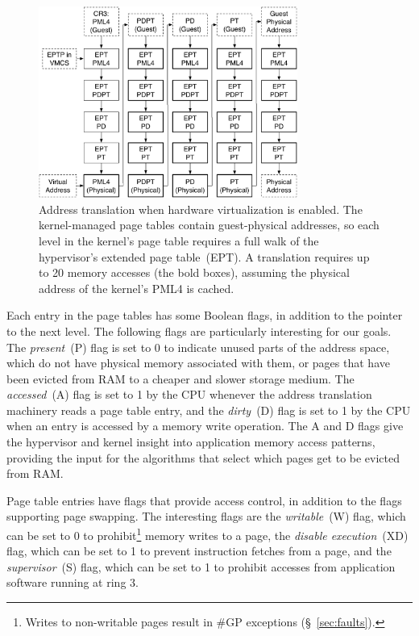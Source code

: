 \begin{figure}[hbt]
  \centering
  \includegraphics[width=85mm]{figures/vmx_paging.pdf}
  \caption{
    Address translation when hardware virtualization is enabled. The
    kernel-managed page tables contain guest-physical addresses, so each level
    in the kernel's page table requires a full walk of the hypervisor's
    extended page table~(EPT).  A translation requires up to 20 memory accesses
    (the bold boxes), assuming the physical address of the kernel's PML4 is
    cached.
  }
  \label{fig:vmx_paging}
\end{figure}

Each entry in the page tables has some Boolean flags, in addition to the
pointer to the next level. The following flags are particularly interesting for
our goals. The \textit{present}~(P) flag is set to 0 to indicate unused parts
of the address space, which do not have physical memory associated with them,
or pages that have been evicted from RAM to a cheaper and slower storage
medium.  The \textit{accessed}~(A) flag is set to 1 by the CPU whenever the
address translation machinery reads a page table entry, and the
\textit{dirty}~(D) flag is set to 1 by the CPU when an entry is accessed by a
memory write operation. The A and D flags give the hypervisor and kernel
insight into application memory access patterns, providing the input for the
algorithms that select which pages get to be evicted from RAM.


Page table entries have flags that provide access control, in addition to the
flags supporting page swapping. The interesting flags are the
\textit{writable}~(W) flag, which can be set to 0 to prohibit\footnote{Writes
to non-writable pages result in \#GP exceptions (\S~\ref{sec:faults}).} memory
writes to a page, the \textit{disable execution}~(XD) flag, which can be set to
1 to prevent instruction fetches from a page, and the \textit{supervisor}~(S)
flag, which can be set to 1 to prohibit accesses from application software
running at ring 3.
